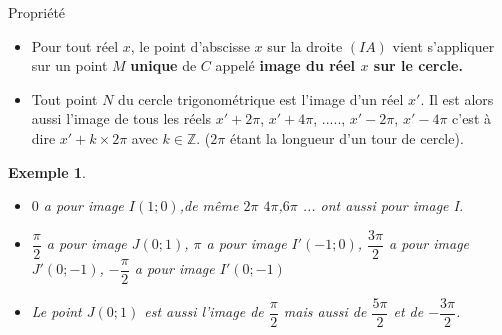 \documentclass[10pt,a4paper]{article}
\theoremstyle{break}
\newtheorem{Ex}{Exemple}
\begin{document}
		
	\begin{bclogo}[couleur = red!25, arrondi = 0.1,logo=\bcbook]{Propriété}
			\begin{itemize}
				\item Pour tout réel $x$, le point d'abscisse $x$ sur la droite $(IA)$ vient s'appliquer sur un point $M$ \textbf{unique} de $C$ appelé\textbf{ image du réel $x$ sur le cercle.}\\
				\item Tout point $N$ du cercle trigonométrique est l'image d'un réel $x'$. Il est alors aussi l'image de tous les réels $x'+2\pi$, $x'+4\pi$, ....., $x'-2\pi$, $x'-4\pi$ c'est à dire $x'+k\times 2\pi$ avec $k\in \mathbb{Z}$. ($2\pi$ étant la longueur d'un tour de cercle).
				
			\end{itemize}
		\end{bclogo}
		\begin{Ex}\begin{itemize}
				\item $0$ a pour image $I(1;0)$,de même $2\pi$ $4\pi$,$6\pi$ ... ont aussi pour image I.\\
				\item  $\dfrac{\pi}{2}$ a pour image $J(0;1)$, $\pi$ a pour image $I'(-1;0)$, $\dfrac{3\pi}{2}$ a pour image $J'(0;-1)$, $-\dfrac{\pi}{2}$ a pour image $I'(0;-1)$
				\item Le point $J(0;1)$ est aussi l'image de $\dfrac{\pi}{2}$ mais aussi de $\dfrac{5\pi}{2}$ et de $-\dfrac{3\pi}{2}$.
			\end{itemize}
			\newpage
		\end{Ex}
\end{document}
